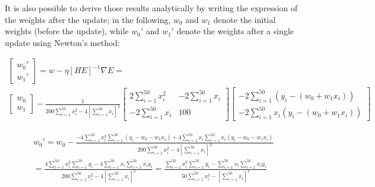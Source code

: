 \documentclass[letterpaper,headings=standardclasses]{scrartcl}
\begin{document}
It is also possible to derive those results analytically by writing the expression of the weights after the update; in the following, $w_0$ and $w_1$ denote the initial weights (before the update), while $w_0'$ and $w_1'$ denote the weights after a single update using Newton's method:

\begin{multline*}
\left[ \begin{matrix} w_0' \\ w_1' \end{matrix} \right] = w - \eta [HE]^{-1} \nabla E = \\
\left[ \begin{matrix} w_0 \\ w_1 \end{matrix} \right] - \frac{1}{200 \sum_{i = 1}^{50} x_i^2 - 4 \left[ \sum_{i = 1}^{50} x_i \right]^2} \left[ \begin{matrix} 2 \sum_{i = 1}^{50} x_i^2 & -2 \sum_{i = 1}^{50} x_i \\[0.5em] -2 \sum_{i = 1}^{50} x_i & 100 \end{matrix} \right] \left[ \begin{matrix} -2 \sum_{i = 1}^{50} (y_i - (w_0 + w_1 x_i)) \\ -2 \sum_{i = 1}^{50} x_i (y_i - (w_0 + w_1 x_i)) \end{matrix} \right]
\end{multline*}

\begin{multline*}
w_0' = w_0 - \frac{-4 \sum_{i = 1}^{50} x_i^2 \sum_{i = 1}^{50} (y_i - w_0 - w_1 x_i) + 4 \sum_{i = 1}^{50} x_i \sum_{i = 1}^{50} x_i(y_i - w_0 - w_1 x_i)}{200 \sum_{i = 1}^{50} x_i^2 - 4 \left[ \sum_{i = 1}^{50} x_i \right]^2} \\
= \frac{4 \sum_{i = 1}^{50} x_i^2 \sum_{i = 1}^{50} y_i - 4 \sum_{i = 1}^{50} x_i \sum_{i = 1}^{50} x_i y_i}{200 \sum_{i = 1}^{50} x_i^2 - 4 \left[ \sum_{i = 1}^{50} x_i \right]^2} = \frac{\sum_{i = 1}^{50} x_i^2 \sum_{i = 1}^{50} y_i - \sum_{i = 1}^{50} x_i \sum_{i = 1}^{50} x_i y_i}{50 \sum_{i = 1}^{50} x_i^2 - \left[ \sum_{i = 1}^{50} x_i \right]^2}
\end{multline*}
\end{document}
